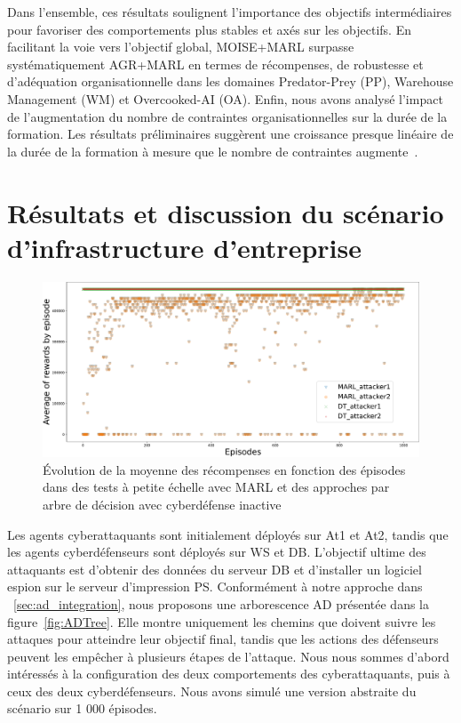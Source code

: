 Dans l'ensemble, ces résultats soulignent l'importance des objectifs intermédiaires pour favoriser des comportements plus stables et axés sur les objectifs. En facilitant la voie vers l'objectif global, MOISE+MARL surpasse systématiquement AGR+MARL en termes de récompenses, de robustesse et d'adéquation organisationnelle dans les domaines Predator-Prey (PP), Warehouse Management (WM) et Overcooked-AI (OA).
Enfin, nous avons analysé l'impact de l'augmentation du nombre de contraintes organisationnelles sur la durée de la formation. Les résultats préliminaires suggèrent une croissance presque linéaire de la durée de la formation à mesure que le nombre de contraintes augmente~\footnotemark[2].

\section{Résultats et discussion du scénario d'infrastructure d'entreprise}\label{sec:results_and_discussion_infra}

\begin{figure}
  \centering
  \includegraphics[width=\linewidth]{figures/graphs.pdf}
  \caption{Évolution de la moyenne des récompenses en fonction des épisodes dans des tests à petite échelle avec MARL et des approches par arbre de décision avec cyberdéfense inactive
  }
  \label{fig:graphs}
\end{figure}

\noindent
Les agents cyberattaquants sont initialement déployés sur At1 et At2, tandis que les agents cyberdéfenseurs sont déployés sur WS et DB. L'objectif ultime des attaquants est d'obtenir des données du serveur DB et d'installer un logiciel espion sur le serveur d'impression PS. Conformément à notre approche dans ~\ref{sec:ad_integration}, nous proposons une arborescence AD présentée dans la figure~\ref{fig:ADTree}. Elle montre uniquement les chemins que doivent suivre les attaques pour atteindre leur objectif final, tandis que les actions des défenseurs peuvent les empêcher à plusieurs étapes de l'attaque.
Nous nous sommes d'abord intéressés à la configuration des deux comportements des cyberattaquants, puis à ceux des deux cyberdéfenseurs. Nous avons simulé une version abstraite du scénario sur 1 000 épisodes.

